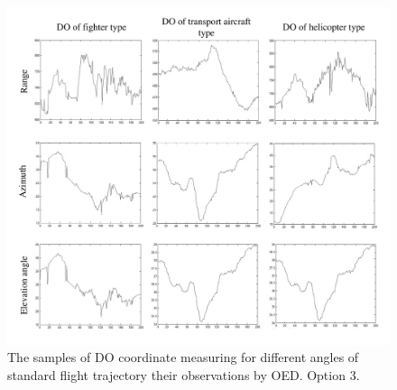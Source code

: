 \begin{figure}[h]
\setcaptionmargin{5mm}
\onelinecaptionstrue
\includegraphics[width=1.0\textwidth]{pics/fig_1_option_3.pdf}
\caption{The samples of DO coordinate measuring for different angles of standard flight trajectory their observations by OED. Option 3.}\label{fig:fig_1_option_3}
\end{figure}
